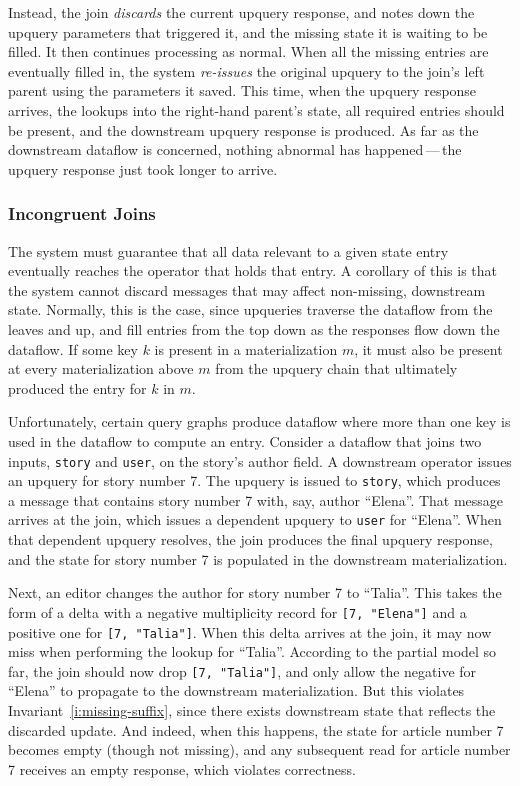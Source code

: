 Instead, the join \emph{discards} the current upquery response, and notes down
the upquery parameters that triggered it, and the missing state it is waiting to
be filled. It then continues processing as normal. When all the missing entries
are eventually filled in, the system \emph{re-issues} the original upquery to
the join's left parent using the parameters it saved. This time, when the
upquery response arrives, the lookups into the right-hand parent's state, all
required entries should be present, and the downstream upquery response is
produced. As far as the downstream dataflow is concerned, nothing abnormal has
happened\,---\,the upquery response just took longer to arrive.

\subsubsection{Incongruent Joins}
\label{join-evictions}

The system must guarantee that all data relevant to a given state entry
eventually reaches the operator that holds that entry. A corollary of this is
that the system cannot discard messages that may affect non-missing, downstream
state. Normally, this is the case, since upqueries traverse the dataflow from
the leaves and up, and fill entries from the top down as the responses flow down
the dataflow. If some key $k$ is present in a materialization $m$, it must also
be present at every materialization above $m$ from the upquery chain that
ultimately produced the entry for $k$ in $m$.

Unfortunately, certain query graphs produce dataflow where more than one key is
used in the dataflow to compute an entry. Consider a dataflow that joins two
inputs, \texttt{story} and \texttt{user}, on the story's author field. A
downstream operator issues an upquery for story number 7. The upquery is issued
to \texttt{story}, which produces a message that contains story number 7 with,
say, author ``Elena''. That message arrives at the join, which issues a
dependent upquery to \texttt{user} for ``Elena''. When that dependent upquery
resolves, the join produces the final upquery response, and the state for story
number 7 is populated in the downstream materialization.

Next, an editor changes the author for story number 7 to ``Talia''. This
takes the form of a delta with a negative multiplicity record for \texttt{[7,
"Elena"]} and a positive one for \texttt{[7, "Talia"]}. When this delta arrives
at the join, it may now miss when performing the lookup for ``Talia''. According
to the partial model so far, the join should now drop \texttt{[7, "Talia"]}, and
only allow the negative for ``Elena'' to propagate to the downstream
materialization. But this violates Invariant~\ref{i:missing-suffix}, since there
exists downstream state that reflects the discarded update. And indeed, when
this happens, the state for article number 7 becomes empty (though not missing),
and any subsequent read for article number 7 receives an empty response, which
violates correctness.

